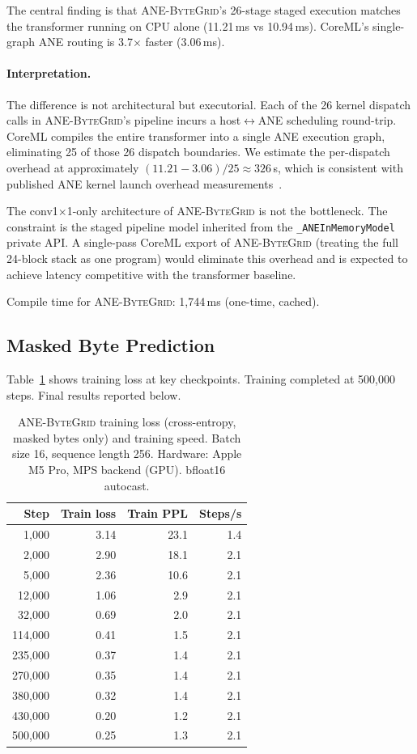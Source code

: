 \documentclass[10pt,twocolumn]{article}
\newcommand{\bytegrid}{\textsc{ANE-ByteGrid}}
\begin{document}
The central finding is that \bytegrid{}'s 26-stage staged execution matches
the transformer running on CPU alone (11.21\,ms vs 10.94\,ms).
CoreML's single-graph ANE routing is 3.7$\times$ faster (3.06\,ms).

\paragraph{Interpretation.}
The difference is not architectural but executorial.
Each of the 26 kernel dispatch calls in \bytegrid{}'s pipeline incurs a
host$\leftrightarrow$ANE scheduling round-trip.
CoreML compiles the entire transformer into a single ANE execution graph,
eliminating 25 of those 26 dispatch boundaries.
We estimate the per-dispatch overhead at approximately
$(11.21 - 3.06) / 25 \approx 326$\,\textmu s, which is consistent with
published ANE kernel launch overhead measurements~\cite{TODO_finkel_ane}.

The conv1$\times$1-only architecture of \bytegrid{} is not the bottleneck.
The constraint is the staged pipeline model inherited from the
\texttt{\_ANEInMemoryModel} private API.
A single-pass CoreML export of \bytegrid{} (treating the full 24-block
stack as one program) would eliminate this overhead and is expected to
achieve latency competitive with the transformer baseline.

Compile time for \bytegrid{}: 1{,}744\,ms (one-time, cached).

\subsection{Masked Byte Prediction}

Table~\ref{tab:training} shows training loss at key checkpoints.
Training completed at 500{,}000 steps. Final results reported below.

\begin{table}[h]
\centering
\caption{\bytegrid{} training loss (cross-entropy, masked bytes only)
and training speed. Batch size 16, sequence length 256. Hardware:
Apple M5 Pro, MPS backend (GPU). bfloat16 autocast.}
\label{tab:training}
\begin{tabular}{rrrr}
\toprule
Step & Train loss & Train PPL & Steps/s \\
\midrule
 1{,}000 & 3.14 & 23.1 & 1.4 \\
 2{,}000 & 2.90 & 18.1 & 2.1 \\
 5{,}000 & 2.36 & 10.6 & 2.1 \\
12{,}000 & 1.06 &  2.9 & 2.1 \\
32{,}000 & 0.69 &  2.0 & 2.1 \\
114{,}000 & 0.41 &  1.5 & 2.1 \\
235{,}000 & 0.37 &  1.4 & 2.1 \\
270{,}000 & 0.35 &  1.4 & 2.1 \\
380{,}000 & 0.32 &  1.4 & 2.1 \\
430{,}000 & 0.20 &  1.2 & 2.1 \\
500{,}000 & 0.25 &  1.3 & 2.1 \\
\bottomrule
\end{tabular}
\end{table}
\end{document}
